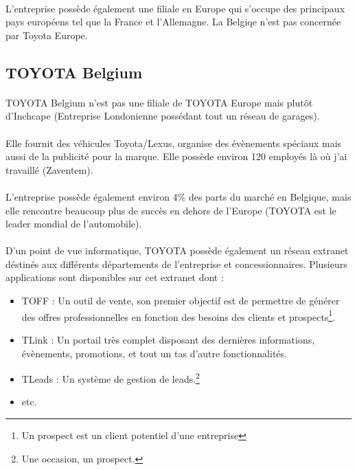 \documentclass[12pt]{report}
\begin{document}
\paragraph{}
L'entreprise possède également une filiale en Europe qui s'occupe des principaux pays européens tel que la France et l'Allemagne. La Belgiqe n'est pas concernée par Toyota Europe. 

\subsection*{TOYOTA Belgium}
\paragraph{}
TOYOTA Belgium n'est pas une filiale de TOYOTA Europe mais plutôt d'Inchcape (Entreprise Londonienne possédant tout un réseau de garages).

\paragraph{}
Elle fournit des véhicules Toyota/Lexus, organise des évènements spéciaux mais aussi de la publicité pour la marque. Elle possède environ 120 employés là où j'ai travaillé (Zaventem). 

\paragraph{}
L'entreprise possède également environ 4\% des parts du marché en Belgique, mais elle rencontre beaucoup plus de succès en dehors de l'Europe (TOYOTA est le leader mondial de l'automobile).

\paragraph{}
D'un point de vue informatique, TOYOTA possède également un réseau extranet déstinés aux différents départements de l'entreprise et concessionnaires. Plusieurs applications sont disponibles sur cet extranet dont :
\begin{itemize}
	\setlength{\itemsep}{5pt} %
	\item TOFF : Un outil de vente, son premier objectif est de permettre de générer des offres professionnelles en fonction des besoins des clients et prospects\footnote{Un prospect est un client potentiel d'une entreprise}. 
	\item TLink : Un portail très complet disposant des dernières informations, évènements, promotions, et tout un tas d'autre fonctionnalités.
	\item TLeads : Un système de gestion de leads.\footnote{Une occasion, un prospect.}
	\item etc.
\end{itemize}
\end{document}
